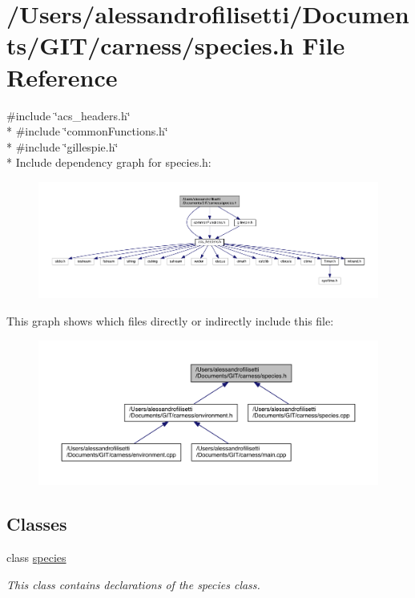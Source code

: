 \hypertarget{a00081}{\section{/\+Users/alessandrofilisetti/\+Documents/\+G\+I\+T/carness/species.h File Reference}
\label{a00081}
}
{\ttfamily \#include \char`\"{}acs\+\_\+headers.\+h\char`\"{}}\\*
{\ttfamily \#include \char`\"{}common\+Functions.\+h\char`\"{}}\\*
{\ttfamily \#include \char`\"{}gillespie.\+h\char`\"{}}\\*
Include dependency graph for species.\+h\+:\nopagebreak
\begin{figure}[H]
\begin{center}
\leavevmode
\includegraphics[width=350pt]{a00206}
\end{center}
\end{figure}
This graph shows which files directly or indirectly include this file\+:\nopagebreak
\begin{figure}[H]
\begin{center}
\leavevmode
\includegraphics[width=350pt]{a00207}
\end{center}
\end{figure}
\subsection*{Classes}
\begin{DoxyCompactItemize}
\item 
class \hyperlink{a00021}{species}
\begin{DoxyCompactList}\small\item\em This class contains declarations of the species class. \end{DoxyCompactList}\end{DoxyCompactItemize}
